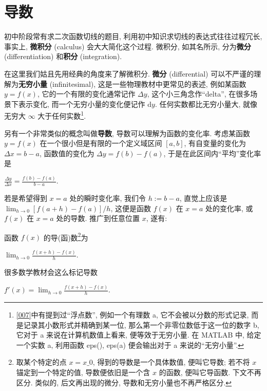 \section{导数}\label{012}

\begin{tcolorbox}[size=fbox, breakable, enhanced jigsaw, title={导数 (derivative)}]

初中阶段常有求二次函数切线的题目,
利用初中知识求切线的表达式往往过程冗长, 事实上, \textbf{微积分}
(calculus) 会大大简化这个过程. 微积分, 如其名所示, 分为\textbf{微分}
(differentiation) 和\textbf{积分 }(integration).

在这里我们姑且先用经典的角度来了解微积分. \textbf{微分} (differential)
可以不严谨的理解为\textbf{无穷小量} (infinitesimal),
这是一些物理教材中更常见的表述, 例如某函数 $y=f(x)$,
它的一个有限的变化通常记作 $\Delta y$, 这个小三角念作``delta'',
在很多场景下表示变化, 而一个无穷小量的变化便记作 $\mathrm{d}y$.
任何实数都比无穷小量大, 就像无穷大 $\infty$ 大于任何实数\footnote{\ref{007}中有提到过``浮点数'', 例如一个有理数 a,
它不会被以分数的形式记录, 而是记录其小数形式并精确到某一位,
那么第一个非零位数低于这一位的数字 b, 它对于 a 来说在计算机数值上看来,
便等效于无穷小量. 在 MATLAB 中, 给定一个实数 a, 利用函数 eps(), eps(a)
便会输出对于 a 来说的``无穷小量''.}.

另有一个非常类似的概念叫做\textbf{导数}, 导数可以理解为函数的变化率.
考虑某函数 $y=f(x)$ 在一个很小但是有限的一个定义域区间 $[a,b]$,
有自变量的变化为 $\Delta x=b-a$, 函数值的变化为
$\Delta y= f(b)-f(a)$, 于是在此区间内``平均''变化率是

$\frac{\Delta y}{\Delta x}=\frac{f(b)-f(a)}{b-a}.$

若是希望得到 $x=a$ 处的瞬时变化率, 我们令 $h:=b-a$, 直觉上应该是
$\lim_{h\rightarrow0}[f(a+h)-f(a)]/h$, 这便是函数 $f(x)$ 在 $x=a$
处的变化率, 或 $f(x)$ 在 $x=a$ 处的导数. 推广到任意位置 $x$, 遂有:

\begin{tcolorbox}[size=fbox, breakable, enhanced jigsaw, title={定义}]
函数 $f(x)$ 的导(函)数\footnote{取某个特定的点 $x=x\_0$,
  得到的导数是一个具体数值, 便叫它导数; 若不将 $x$ 锚定到一个特定的值,
  导数便依旧是一个含 $x$ 的函数, 便叫它导函数. 下文不再区分. 类似的,
  后文再出现的微分, 导数和无穷小量也不再严格区分.}为

$\lim_{h\rightarrow0}\frac{f(x+h)-f(x)}{h}.$
\end{tcolorbox}

很多数学教材会这么标记导数

$\boxed{f'(x)=\lim_{h\rightarrow0}\frac{f(x+h)-f(x)}{h}}.$


\end{tcolorbox}
